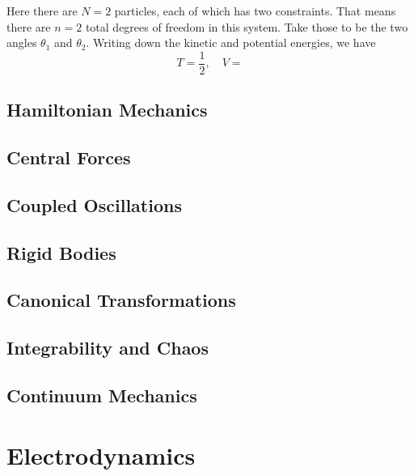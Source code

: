 \documentclass[
  letterpaper,
  DIV=11,
  numbers=noendperiod]{scrreprt}
\begin{document}
Here there are \(N=2\) particles, each of which has two constraints.
That means there are \(n=2\) total degrees of freedom in this system.
Take those to be the two angles \(\theta_1\) and \(\theta_2\). Writing
down the kinetic and potential energies, we have \[
T = \frac{1}{2}, \quad V = 
\]

\hypertarget{hamiltonian-mechanics}{%
\chapter{Hamiltonian Mechanics}\label{hamiltonian-mechanics}}

\hypertarget{central-forces}{%
\chapter{Central Forces}\label{central-forces}}

\hypertarget{coupled-oscillations}{%
\chapter{Coupled Oscillations}\label{coupled-oscillations}}

\hypertarget{rigid-bodies}{%
\chapter{Rigid Bodies}\label{rigid-bodies}}

\hypertarget{canonical-transformations}{%
\chapter{Canonical Transformations}\label{canonical-transformations}}

\hypertarget{integrability-and-chaos}{%
\chapter{Integrability and Chaos}\label{integrability-and-chaos}}

\hypertarget{continuum-mechanics}{%
\chapter{Continuum Mechanics}\label{continuum-mechanics}}

\part{Electrodynamics}
\end{document}
